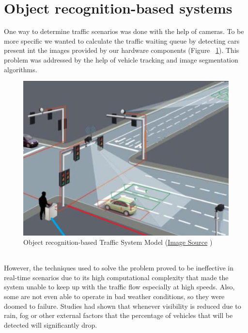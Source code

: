 \documentclass[17pt]{report}
\begin{document}
\section{Object recognition-based systems}
\indent \indent
One way to determine traffic scenarios was done with
the help of cameras. To be more specific we wanted to 
calculate the traffic waiting queue by detecting cars 
present int the images provided by our hardware components (Figure ~\ref{fig:ObjectRecognitionSystem}).
This problem was addressed by the help of vehicle tracking
and image segmentation algorithms.
\begin{figure}[h!]
    \includegraphics[width=\textwidth]{ObjectRecognitionSystemRepresentation.png}
    \caption{Object recognition-based Traffic System Model 
    (\href{https://english.mathrubhumi.com/news/kerala/knowing-traffic-camera-locations-isn-t-enough-to-escape-from-them-mvd-can-move-them-easily-1.7427787}{Image Source} \textcopyright)}
    \label{fig:ObjectRecognitionSystem}
\end{figure}
\\
\indent \indent
However, the techniques used to solve the problem proved to 
be ineffective in real-time scenarios due to its high
computational complexity that made the system unable to keep up 
with the traffic flow especially at high speeds.
Also, some are not even able to operate in bad weather conditions,
so they were doomed to failure. Studies had shown that whenever
visibility is reduced due to rain, fog or other external factors that
the percentage of vehicles that will be detected will significantly drop.
\cite{Sheeny2021} \\
\end{document}
